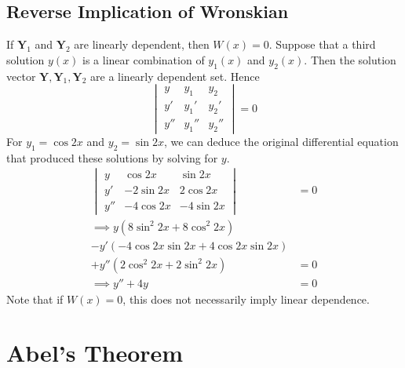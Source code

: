 \documentclass{article}
\begin{document}
\subsection{Reverse Implication of Wronskian}
If $\bm Y_1$ and $\bm Y_2$ are linearly dependent, then $W(x) = 0$. Suppose that a third solution $y(x)$ is a linear combination of $y_1(x)$ and $y_2(x)$. Then the solution vector $\bm Y, \bm Y_1, \bm Y_2$ are a linearly dependent set. Hence
\[
	\begin{vmatrix}
		y   & y_1   & y_2   \\
		y'  & y_1'  & y_2'  \\
		y'' & y_1'' & y_2''
	\end{vmatrix}
	= 0
\]
For $y_1 = \cos 2x$ and $y_2 = \sin 2x$, we can deduce the original differential equation that produced these solutions by solving for $y$.
\begin{align*}
	\begin{vmatrix}
		y   & \cos 2x   & \sin 2x    \\
		y'  & -2\sin 2x & 2 \cos 2x  \\
		y'' & -4\cos 2x & -4 \sin 2x
	\end{vmatrix}          & = 0 \\
	\implies y(8\sin^2 2x + 8\cos^2 2x) &     \\ - y'(-4 \cos 2x \sin 2x + 4 \cos 2x \sin 2x) &\\ + y''(2\cos^2 2x + 2\sin^2 2x) &= 0 \\
	\implies y'' + 4y                   & = 0
\end{align*}
Note that if $W(x) = 0$, this does not necessarily imply linear dependence.

\section{Abel's Theorem}
\end{document}
